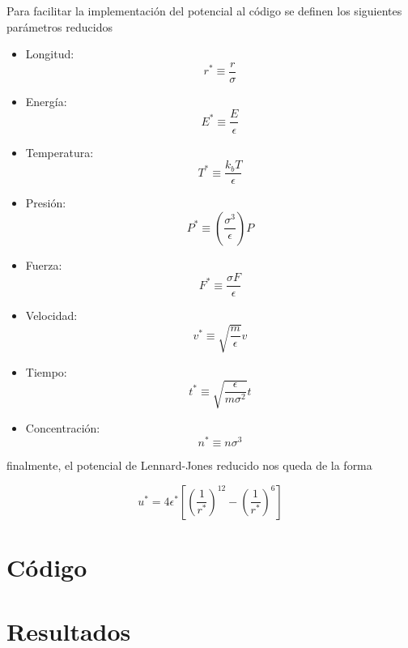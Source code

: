 \documentclass[12pt,letterpaper]{article}
\begin{document}
Para facilitar la implementación del potencial al código se definen los siguientes parámetros reducidos

\begin{itemize}
\item Longitud: \begin{equation*}
r^* \equiv \frac{r}{\sigma}
\end{equation*}
\item Energía: \begin{equation*}
E^* \equiv \frac{E}{\epsilon}
\end{equation*}
\item Temperatura: \begin{equation*}
T^* \equiv \frac{k_bT}{\epsilon}
\end{equation*}
\item Presión: \begin{equation*}
P^* \equiv \left(\frac{\sigma^3}{\epsilon}\right) P
\end{equation*}
\item Fuerza: \begin{equation*}
F^* \equiv \frac{\sigma F}{\epsilon}
\end{equation*}
\item Velocidad: \begin{equation*}
v^* \equiv \sqrt{\frac{m}{\epsilon}}v
\end{equation*}
\item Tiempo: \begin{equation*}
t^* \equiv \sqrt{\frac{\epsilon}{m\sigma^2}}t
\end{equation*}
\item Concentración: \begin{equation*}
n^* \equiv n\sigma^3
\end{equation*}
\end{itemize}
finalmente, el potencial de Lennard-Jones reducido nos queda de la forma 

\begin{equation}
u^* = 4\epsilon^* \left[\left(\frac{1}{r^*}\right)^{12} - \left(\frac{1}{r^*}\right)^6 \right]
\end{equation}


\section*{Código}

\section*{Resultados}
\end{document}
